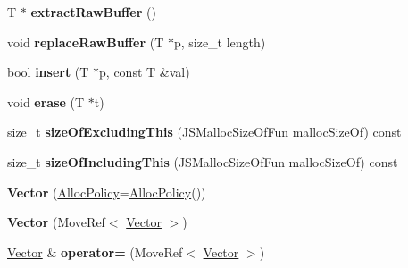 \begin{DoxyCompactItemize}
\item 
\hypertarget{classjs_1_1_vector_ae958f81772b58d0868aef629a9a4330f}{T $\ast$ {\bfseries extract\-Raw\-Buffer} ()}\label{classjs_1_1_vector_ae958f81772b58d0868aef629a9a4330f}

\item 
\hypertarget{classjs_1_1_vector_acd602ca06e8116719fd334f220090bb5}{void {\bfseries replace\-Raw\-Buffer} (T $\ast$p, size\-\_\-t length)}\label{classjs_1_1_vector_acd602ca06e8116719fd334f220090bb5}

\item 
\hypertarget{classjs_1_1_vector_ad13946bf7c66096a116104bd70a15250}{bool {\bfseries insert} (T $\ast$p, const T \&val)}\label{classjs_1_1_vector_ad13946bf7c66096a116104bd70a15250}

\item 
\hypertarget{classjs_1_1_vector_a1f69a134f4784e5e8ddaf457dd776504}{void {\bfseries erase} (T $\ast$t)}\label{classjs_1_1_vector_a1f69a134f4784e5e8ddaf457dd776504}

\item 
\hypertarget{classjs_1_1_vector_ad71e14f9a9fc82fe27a26f27edddac24}{size\-\_\-t {\bfseries size\-Of\-Excluding\-This} (J\-S\-Malloc\-Size\-Of\-Fun malloc\-Size\-Of) const }\label{classjs_1_1_vector_ad71e14f9a9fc82fe27a26f27edddac24}

\item 
\hypertarget{classjs_1_1_vector_a5c8d57fde1f949f5185ade2a08327ede}{size\-\_\-t {\bfseries size\-Of\-Including\-This} (J\-S\-Malloc\-Size\-Of\-Fun malloc\-Size\-Of) const }\label{classjs_1_1_vector_a5c8d57fde1f949f5185ade2a08327ede}

\item 
\hypertarget{classjs_1_1_vector_a6898671cd5ba28c4c818dead2666e0b6}{{\bfseries Vector} (\hyperlink{class_alloc_policy}{Alloc\-Policy}=\hyperlink{class_alloc_policy}{Alloc\-Policy}())}\label{classjs_1_1_vector_a6898671cd5ba28c4c818dead2666e0b6}

\item 
\hypertarget{classjs_1_1_vector_ac20f3e322439426f0a44c92fff23ac5b}{{\bfseries Vector} (Move\-Ref$<$ \hyperlink{classjs_1_1_vector}{Vector} $>$)}\label{classjs_1_1_vector_ac20f3e322439426f0a44c92fff23ac5b}

\item 
\hypertarget{classjs_1_1_vector_a8642d5157c4a60c8859ee4618452357f}{\hyperlink{classjs_1_1_vector}{Vector} \& {\bfseries operator=} (Move\-Ref$<$ \hyperlink{classjs_1_1_vector}{Vector} $>$)}\label{classjs_1_1_vector_a8642d5157c4a60c8859ee4618452357f}


\end{DoxyCompactItemize}
